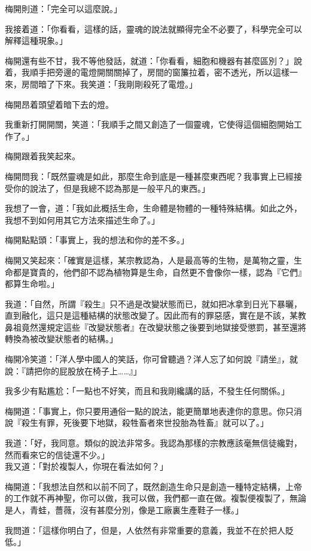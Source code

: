 梅開則道：「完全可以這麼說。」

我接着道：「你看看，這樣的話，靈魂的說法就顯得完全不必要了，科學完全可以解釋這種現象。」

梅開還有些不甘，我不等他發話，就道：「你看看，細胞和機器有甚麼區別？」說着，我順手把旁邊的電燈開關關掉了，房間的窗簾拉着，密不透光，所以這樣一來，房間暗了下來。我笑道：「我剛剛殺死了電燈。」

梅開昂着頭望着暗下去的燈。

我重新打開開關，笑道：「我順手之間又創造了一個靈魂，它使得這個細胞開始工作了。」

梅開跟着我笑起來。

梅開問我：「既然靈魂是如此，那麼生命到底是一種甚麼東西呢？我事實上已經接受你的說法了，但是我總不認為那是一般平凡的東西。」

我想了一會，道：「我如此概括生命，生命體是物體的一種特殊結構。如此之外，我想不到如何用其它方法來描述生命了。」

梅開點點頭：「事實上，我的想法和你的差不多。」

梅開又笑起來：「確實是這樣，某宗教認為，人是最高等的生物，是萬物之靈，生命都是寶貴的，他們卻不認為植物算是生命，自然更不會像你一樣，認為『它們』都算生命啦。」

我道：「自然，所謂『殺生』只不過是改變狀態而已，就如把冰拿到日光下暴曬，直到融化，這只是這種結構的狀態改變了。因此而有的罪惡感，實在是不該，某教鼻祖竟然還規定這些『改變狀態者』在改變狀態之後要到地獄接受懲罰，甚至還將轉換為被改變狀態者的結構。」

梅開冷笑道：「洋人學中國人的笑話，你可曾聽過？洋人忘了如何說『請坐』，就說：『請把你的屁股放在椅子上……』」

我多少有點尷尬：「一點也不好笑，而且和我剛纔講的話，不發生任何關係。」


梅開道：「事實上，你只要用通俗一點的說法，能更簡單地表達你的意思。你只消說『殺生有罪，死後要下地獄，殺牲畜者來世投胎為牲畜』就可以了。」

我道：「好，我同意。類似的說法非常多。我認為那樣的宗教應該毫無信徒纔對，然而看來它的信徒還不少。」
\\


我又道：「對於複製人，你現在看法如何？」

梅開道：「我想法自然和以前不同了，既然創造生命只是創造一種特定結構，上帝的工作就不再神聖，你可以做，我可以做，我們都一直在做。複製便複製了，無論是人，青蛙，薔薇，沒有甚麼分別，像是工廠裏生產鞋子一樣。」

我問道：「這樣你明白了，但是，人依然有非常重要的意義，我並不在於把人貶低。」

